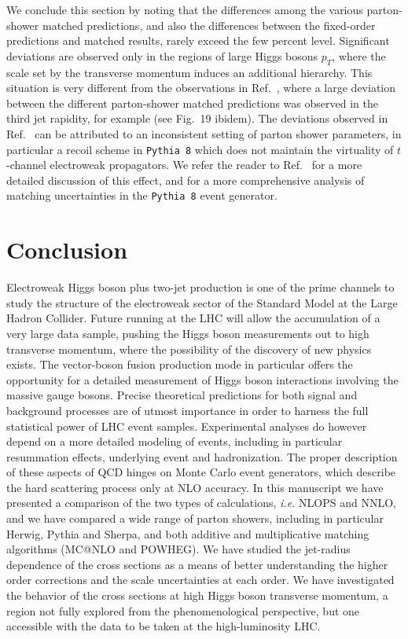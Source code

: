 \documentclass[10pt,prd,fleqn,superscriptaddress,notitlepage,nofootinbib,preprintnumbers,nobalancelastpage]{revtex4-1}
\newcommand{\PY}{\texttt{Pythia 8}\xspace}
\begin{document}
We conclude this section by noting that the differences among the various parton-shower matched predictions, 
and also the differences between the fixed-order predictions and matched results, rarely exceed the few percent level.
Significant deviations are observed only in the regions of large Higgs bosons $p_T$, where the scale set 
by the transverse momentum induces an additional hierarchy. 
This situation is very different from the observations in Ref.~\cite{Ballestrero:2018anz}, where a large deviation between
the different parton-shower matched predictions was observed in the third jet rapidity, for example (see Fig.~19 ibidem).
The deviations observed in Ref.~\cite{Ballestrero:2018anz} can be attributed to an inconsistent setting 
of parton shower parameters, in particular a recoil scheme in \PY{} which does not maintain the virtuality
of $t$-channel electroweak propagators. We refer the reader to Ref.~\cite{Hoche:2021mkv} for a more detailed 
discussion of this effect, and for a more comprehensive analysis of matching uncertainties in the \PY{} event generator.

\section{Conclusion}
\label{sec:conclusions}
Electroweak Higgs boson plus two-jet production is one of the prime channels to study the structure of the electroweak sector of the Standard Model at the Large Hadron Collider. Future running at the  LHC will allow the accumulation of a very large data sample, pushing the Higgs boson measurements out to high transverse momentum, where the possibility of the discovery of new physics exists. The vector-boson fusion production mode in particular offers the opportunity for a detailed measurement of Higgs boson interactions involving the massive gauge bosons. Precise theoretical predictions for both signal and background processes are of utmost importance in order to harness the full statistical power of LHC event samples. Experimental analyses do however depend on a more detailed modeling of events, including in particular resummation effects, underlying event and hadronization. The proper description of these aspects of QCD hinges on Monte Carlo event generators, which describe the hard scattering process only at NLO accuracy. In this manuscript we have presented a comparison of the two types of calculations, \emph{i.e.} NLOPS and NNLO, and we have compared a wide range of parton showers, including in particular Herwig, Pythia and Sherpa,
and both  additive and multiplicative matching algorithms (MC@NLO and POWHEG). We have studied the jet-radius dependence of the cross sections as a means of better understanding the higher order corrections and the scale uncertainties at each order. We have investigated the behavior of the cross sections at high Higgs boson transverse momentum, a region not fully explored from the phenomenological perspective, but one accessible with the data to be taken at the high-luminosity LHC.
\end{document}
